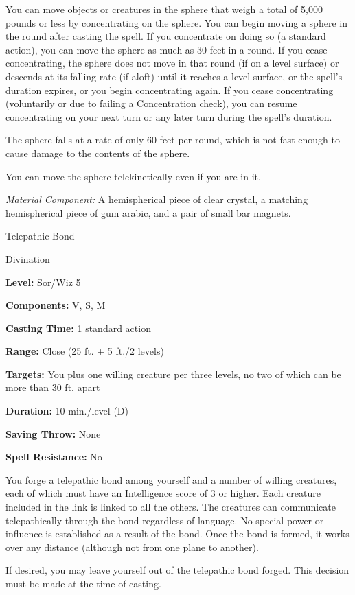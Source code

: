 \documentclass{article}
\begin{document}
You can move objects or creatures in the sphere that weigh a total of 5,000 pounds 
or less by concentrating on the sphere. You can begin moving a sphere in the round 
after casting the spell. If you concentrate on doing so (a standard action), you 
can move the sphere as much as 30 feet in a round. If you cease concentrating, 
the sphere does not move in that round (if on a level surface) or descends at its 
falling rate (if aloft) until it reaches a level surface, or the spell's duration 
expires, or you begin concentrating again. If you cease concentrating (voluntarily 
or due to failing a Concentration check), you can resume concentrating on your 
next turn or any later turn during the spell's duration.

The sphere falls at a rate of only 60 feet per round, which is not fast enough 
to cause damage to the contents of the sphere.

You can move the sphere telekinetically even if you are in it.

\textit{Material Component: }A hemispherical piece of clear crystal, a matching 
hemispherical piece of gum arabic, and a pair of small bar magnets.

\vspace{12pt}
Telepathic Bond

Divination

\textbf{Level:} Sor/Wiz 5

\textbf{Components:} V, S, M

\textbf{Casting Time:} 1 standard action

\textbf{Range:} Close (25 ft. + 5 ft./2 levels)

\textbf{Targets:} You plus one willing creature per three levels, no two of which 
can be more than 30 ft. apart

\textbf{Duration:} 10 min./level (D)

\textbf{Saving Throw:} None

\textbf{Spell Resistance:} No

You forge a telepathic bond among yourself and a number of willing creatures, each 
of which must have an Intelligence score of 3 or higher. Each creature included 
in the link is linked to all the others. The creatures can communicate telepathically 
through the bond regardless of language. No special power or influence is established 
as a result of the bond. Once the bond is formed, it works over any distance (although 
not from one plane to another).

If desired, you may leave yourself out of the telepathic bond forged. This decision 
must be made at the time of casting.
\end{document}
